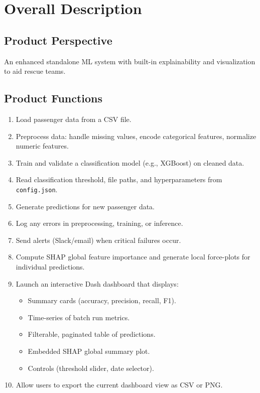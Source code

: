 \documentclass[15pt]{article}
\begin{document}
\section{Overall Description}

\subsection{Product Perspective}
An enhanced standalone ML system with built-in explainability and visualization to aid rescue teams.

\subsection{Product Functions}
\begin{enumerate}[label=\textbullet]
  \item Load passenger data from a CSV file.
  \item Preprocess data: handle missing values, encode categorical features, normalize numeric features.
  \item Train and validate a classification model (e.g., XGBoost) on cleaned data.
  \item Read classification threshold, file paths, and hyperparameters from \texttt{config.json}.
  \item Generate predictions for new passenger data.
  \item Log any errors in preprocessing, training, or inference.
  \item Send alerts (Slack/email) when critical failures occur.
  \item Compute SHAP global feature importance and generate local force-plots for individual predictions.
  \item Launch an interactive Dash dashboard that displays:
    \begin{itemize}
      \item Summary cards (accuracy, precision, recall, F1).
      \item Time-series of batch run metrics.
      \item Filterable, paginated table of predictions.
      \item Embedded SHAP global summary plot.
      \item Controls (threshold slider, date selector).
    \end{itemize}
  \item Allow users to export the current dashboard view as CSV or PNG.
\end{enumerate}
\end{document}
